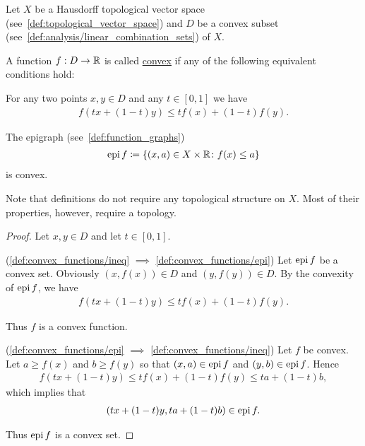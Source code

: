 Let $X$ be a Hausdorff topological vector space (see~\cref{def:topological_vector_space}) and $D$ be a convex subset (see~\cref{def:analysis/linear_combination_sets}) of $X$.

\begin{definition}\label{def:convex_functions}
  A function $f: D \to \mathbb{R}$ is called \uline{convex} if any of the following equivalent conditions hold:

  \begin{defenum}
    \item\label{def:convex_functions/ineq} For any two points $x, y \in D$ and any $t \in [0, 1]$ we have
    \begin{align*}
      f(tx + (1-t)y) \leq tf(x) + (1-t)f(y).
    \end{align*}

    \item\label{def:convex_functions/epi} The epigraph (see~\cref{def:function_graphs})
    \begin{align*}
      \operatorname{epi} f \coloneqq \{ (x, a) \in X \times \mathbb{R} \colon f(x) \leq a \}
    \end{align*}
    is convex.
  \end{defenum}

  Note that definitions do not require any topological structure on $X$. Most of their properties, however, require a topology.
\end{definition}
\begin{proof}
  Let $x, y \in D$ and let $t \in [0, 1]$.

  (\ref{def:convex_functions/ineq} $\implies$ \ref{def:convex_functions/epi}) Let $\operatorname{epi} f$ be a convex set. Obviously $(x, f(x)) \in D$ and $(y, f(y)) \in D$. By the convexity of $\operatorname{epi} f$, we have
  \begin{align*}
    f(tx + (1-t)y) \leq tf(x) + (1-t)f(y).
  \end{align*}

  Thus $f$ is a convex function.

  (\ref{def:convex_functions/epi} $\implies$ \ref{def:convex_functions/ineq}) Let $f$ be convex. Let $a \geq f(x)$ and $b \geq f(y)$ so that $(x, a) \in \operatorname{epi} f$ and $(y, b) \in \operatorname{epi} f$. Hence
  \begin{align*}
    f(tx + (1-t)y) \leq tf(x) + (1-t)f(y) \leq ta + (1-t)b,
  \end{align*}
  which implies that
  \begin{align*}
    (tx + (1-t)y, ta + (1-t)b) \in \operatorname{epi} f.
  \end{align*}

  Thus $\operatorname{epi} f$ is a convex set.
\end{proof}

